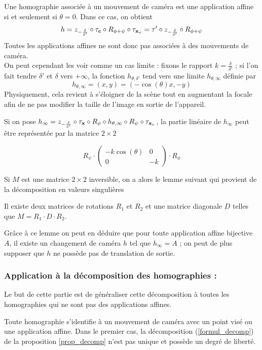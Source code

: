 \begin{Remaffin}
Une homographie associée à un mouvement de caméra est une application affine si et seulement si $\theta=0$. Dans ce cas, on obtient  
\begin{equation*}
h=z_{-\frac{\delta}{\delta'}} \circ \tau_{\mathbf{c}} \circ R_{\phi+\psi} \circ \tau_{\mathbf{x}_{v}}
=\tau' \circ z_{-\frac{\delta}{\delta'}} \circ  R_{\phi+\psi}
\end{equation*}
Toutes les applications affines ne sont donc pas associées à des mouvements de caméra.\\
On peut cependant les voir comme un cas limite : fixons le rapport  $k=\frac{\delta}{\delta'}$ ; si l'on fait tendre $\delta'$ et $\delta$ vers $+\infty$, la fonction $h_{\theta,\delta'}$ tend vers une limite $h_{\theta,\infty}$ définie par
\begin{equation*}
h_{\theta,\infty}=(x,y)=(-\cos(\theta)x,-y)
\end{equation*}
Physiquement, cela revient à s'éloigner de la scène tout en augmentant la focale afin de ne pas modifier la taille de l'image en sortie de l'appareil.

Si on pose $h_\infty = z_{-\frac{\delta}{\delta'}} \circ \tau_{\mathbf{x}} \circ R_{\phi} \circ h_{\theta,\infty} \circ R_{\psi} \circ \tau_{\mathbf{x}_{v}}$, la partie linéaire de $h_{\infty}$ peut être représentée par la matrice $2\times2$

\begin{equation*}
R_{\psi} \cdot 
\begin{pmatrix}
-k\cos(\theta)&0\\
0&-k
\end{pmatrix}
\cdot R_{\phi}
\end{equation*}

Si  $M$ est une matrice $2\times 2$ inversible, on a alors le lemme suivant qui provient de la décomposition en valeurs singulières \cite{morel2009asift}
\begin{lem}
Il existe deux matrices de rotations $R_1$ et $R_2$  et une matrice diagonale $D$ telles que $M = R_1 \cdot D \cdot R_2$.
\end{lem}
Grâce à ce lemme on peut en déduire que pour toute application affine bijective $A$, il existe un changement de caméra $h$ tel que $h_\infty = A$ ; on peut de plus supposer que $h$ ne possède pas de translation de sortie.
\end{Remaffin}


\subsubsection{Application à la décomposition des homographies :}
Le but de cette partie est de généraliser cette décomposition à toutes les homographies qui ne sont pas des applications affines.
\begin{prop}
Toute homographie s'identifie à un mouvement de caméra avec un point visé ou une application affine. Dans le premier cas, la décomposition (\ref{formul_decomp}) de la proposition \ref{prop_decomp} n'est pas unique et possède un degré de liberté.
\label{thepropdecomp}
\end{prop}
